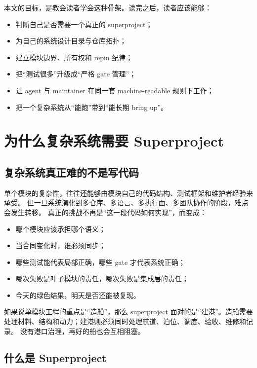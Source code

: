 \documentclass[UTF8,11pt,a4paper,oneside]{ctexbook}
\begin{document}
本文的目标，是教会读者学会这种骨架。读完之后，读者应该能够：

\begin{itemize}
  \item 判断自己是否需要一个真正的 superproject；
  \item 为自己的系统设计目录与仓库拓扑；
  \item 建立模块边界、所有权和 repin 纪律；
  \item 把“测试很多”升级成“严格 gate 管理”；
  \item 让 agent 与 maintainer 在同一套 machine-readable 规则下工作；
  \item 把一个复杂系统从“能跑”带到“能长期 bring up”。
\end{itemize}

\tableofcontents

\mainmatter

\chapter{为什么复杂系统需要 Superproject}

\section{复杂系统真正难的不是写代码}

单个模块的复杂性，往往还能够由模块自己的代码结构、测试框架和维护者经验来承受。
但一旦系统演化到多仓库、多语言、多执行面、多团队协作的阶段，难点会发生转移。
真正的挑战不再是“这一段代码如何实现”，而变成：

\begin{itemize}
  \item 哪个模块应该承担哪个语义；
  \item 当合同变化时，谁必须同步；
  \item 哪些测试能代表局部正确，哪些 gate 才代表系统正确；
  \item 哪次失败是叶子模块的责任，哪次失败是集成层的责任；
  \item 今天的绿色结果，明天是否还能被复现。
\end{itemize}

如果说单模块工程的重点是“造船”，那么 superproject 面对的是“建港”。造船需要
处理材料、结构和动力；建港则必须同时处理航道、泊位、调度、验收、维修和记录。
没有港口治理，再好的船也会互相阻塞。

\section{什么是 Superproject}
\end{document}
